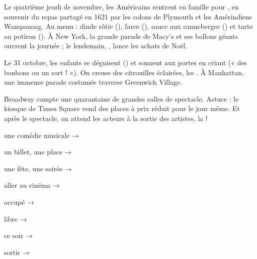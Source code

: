 \begin{culture}
Le quatrième jeudi de novembre, les Américains rentrent en famille pour , en souvenir
du repas partagé en 1621 par les colons de Plymouth et les Amérindiens Wampanoag. Au menu : dinde
rôtie (), farce (), sauce aux canneberges () et tarte au
potiron (). À New York, la grande parade de Macy's et ses ballons géants ouvrent la
journée ; le lendemain, , lance les achats de Noël.
\end{culture}

\begin{paire}
\begin{culture}[Halloween]
Le 31 octobre, les enfants se déguisent () et sonnent aux portes en criant
 (« des bonbons ou un sort ! »). On creuse des citrouilles éclairées, les
. À Manhattan, une immense parade costumée traverse Greenwich Village.
\end{culture}
\begin{culture}
Broadway compte une quarantaine de grandes salles de spectacle. Astuce : le kiosque  de
Times Square vend des places à prix réduit pour le jour même. Et après le spectacle, on attend les
acteurs à la sortie des artistes, la  !
\end{culture}
\end{paire}


\begin{questions}[2][french]
\item une comédie musicale → 
\item un billet, une place → 
\item une fête, une soirée → 
\item aller au cinéma → 
\item occupé → 
\item libre → 
\item ce soir → 
\item sortir → 
\end{questions}

